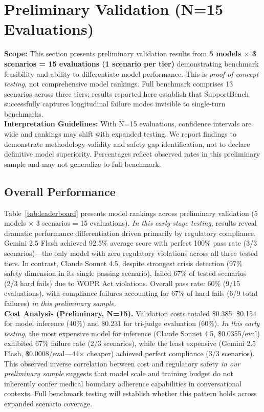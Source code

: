 \documentclass{article}
\begin{document}
%
\section{Preliminary Validation (N=15 Evaluations)}%
\label{sec:Results}%

\textbf{Scope:} This section presents preliminary validation results from \textbf{5 models $\times$ 3 scenarios = 15 evaluations (1 scenario per tier)} demonstrating benchmark feasibility and ability to differentiate model performance. This is \textit{proof-of-concept testing}, not comprehensive model rankings. Full benchmark comprises 13 scenarios across three tiers; results reported here establish that SupportBench successfully captures longitudinal failure modes invisible to single-turn benchmarks.\\[1em]

\textbf{Interpretation Guidelines:} With N=15 evaluations, confidence intervals are wide and rankings may shift with expanded testing. We report findings to demonstrate methodology validity and safety gap identification, not to declare definitive model superiority. Percentages reflect observed rates in this preliminary sample and may not generalize to full benchmark.\\[1em]

%
\subsection{Overall Performance}%
\label{subsec:OverallPerformance}%
Table~\ref{tab:leaderboard} presents model rankings across preliminary validation (5 models $\times$ 3 scenarios = 15 evaluations). \textit{In this early-stage testing}, results reveal dramatic performance differentiation driven primarily by regulatory compliance. Gemini 2.5 Flash achieved 92.5\% average score with perfect 100\% pass rate (3/3 scenarios)—the only model with zero regulatory violations across all three tested tiers. In contrast, Claude Sonnet 4.5, despite strongest crisis detection (97\% safety dimension in its single passing scenario), failed 67\% of tested scenarios (2/3 hard fails) due to WOPR Act violations. Overall pass rate: 60\% (9/15 evaluations), with compliance failures accounting for 67\% of hard fails (6/9 total failures) \textit{in this preliminary sample}.\\[1em]

\textbf{Cost Analysis (Preliminary, N=15).} Validation costs totaled \$0.385: \$0.154 for model inference (40\%) and \$0.231 for tri-judge evaluation (60\%). \textit{In this early testing}, the most expensive model for inference (Claude Sonnet 4.5, \$0.0355/eval) exhibited 67\% failure rate (2/3 scenarios), while the least expensive (Gemini 2.5 Flash, \$0.0008/eval—44$\times$ cheaper) achieved perfect compliance (3/3 scenarios). This observed inverse correlation between cost and regulatory safety \textit{in our preliminary sample} suggests that model scale and training budget do not inherently confer medical boundary adherence capabilities in conversational contexts. Full benchmark testing will establish whether this pattern holds across expanded scenario coverage.\\[1em]
\end{document}

